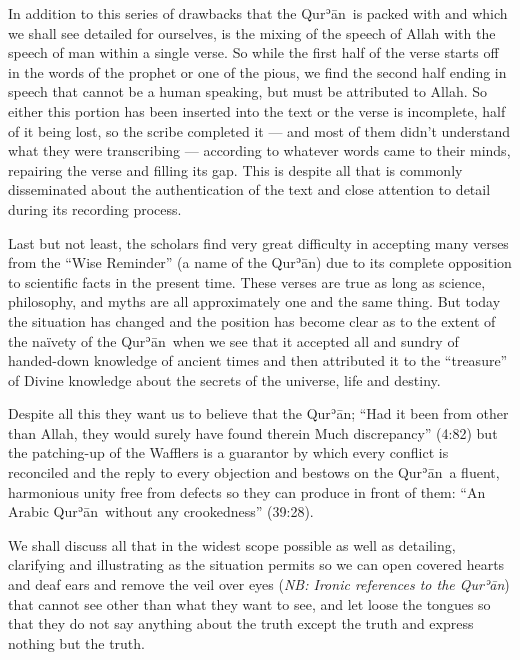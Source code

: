 \documentclass[12pt]{memoir}
\def\´{ʾ} %
\def \Quran{Qur\-\´ān} %
\def\–{-\hskip0pt}
\newcommand{\QRef}[1]{{\color{darkblue}#1}}
\newcommand{\NB}[1]{\emph{\small NB: #1}}
\begin{document}
In addition to this series of drawbacks that the \Quran\ is packed with
and which we shall see detailed for ourselves,
is the mixing of the speech of Allah with
the speech of man within a single verse.
So while the first half of the verse starts off
in the words of the prophet or one of the pious,
we find the second half ending in speech that cannot be a human speaking,
but must be attributed to Allah.
So either this portion has been inserted
into the text or the verse is incomplete,
half of it being lost, so the scribe completed it —
and most of them didn’t understand what they were transcribing —
according to whatever words came to their minds,
repairing the verse and filling its gap.
This is despite all that is commonly disseminated
about the authentication of the text and close attention
to detail during its recording process.

Last but not least, the scholars find very great difficulty in
accepting many verses from the “Wise Reminder” (a name of the \Quran)
due to its complete opposition to scientific facts in the present time.
These verses are true as long as science, philosophy,
and myths are all approximately one and the same thing.
But today the situation has changed and the position has become clear
as to the extent of the naïvety of the \Quran\ when we see
that it accepted all and sundry of handed\–down knowledge of ancient times
and then attributed it to the “treasure” of Divine knowledge
about the secrets of the universe, life and destiny.

Despite all this they want us to believe that the \Quran;
“Had it been from other than Allah, they would surely
have found therein Much discrepancy” (\QRef{4:82})
but the patching\–up of the Wafflers is a guarantor by which every conflict
is reconciled and the reply to every objection
and bestows on the \Quran\ a fluent,
harmonious unity free from defects so they can produce in front of them:
“An Arabic \Quran\ without any crookedness” (\QRef{39:28}).

We shall discuss all that in the widest scope possible as well as detailing,
clarifying and illustrating as the situation permits so we can open
covered hearts and deaf ears and remove the veil over eyes
(\NB{Ironic references to the \Quran})
that cannot see other than what they want to see, and let loose the tongues
so that they do not say anything about the truth
except the truth and express nothing but the truth.
\end{document}
